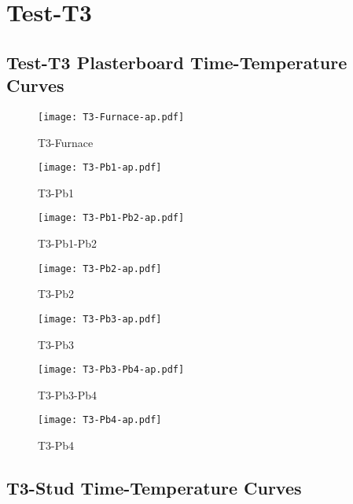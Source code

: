 \pagebreak

\section*{Test-T3}
\subsection*{Test-T3 Plasterboard Time-Temperature Curves}

\begin{figure}[htbp]
\centering
	\texttt{[image: T3-Furnace-ap.pdf]}
	\caption*{T3-Furnace}
\end{figure}
\begin{figure}[htbp]
	\centering
		\texttt{[image: T3-Pb1-ap.pdf]}
		\caption*{T3-Pb1}
\end{figure}
\begin{figure}[htbp]
	\centering
		\texttt{[image: T3-Pb1-Pb2-ap.pdf]}
		\caption*{T3-Pb1-Pb2}
\end{figure}
\begin{figure}[htbp]
	\centering
		\texttt{[image: T3-Pb2-ap.pdf]}
		\caption*{T3-Pb2}
\end{figure}
\begin{figure}[htbp]
	\centering
		\texttt{[image: T3-Pb3-ap.pdf]}
		\caption*{T3-Pb3}
\end{figure}
\begin{figure}[htbp]
	\centering
			\texttt{[image: T3-Pb3-Pb4-ap.pdf]}
			\caption*{T3-Pb3-Pb4}
\end{figure}
\begin{figure}[htbp]
	\centering
			\texttt{[image: T3-Pb4-ap.pdf]}
			\caption*{T3-Pb4}
\end{figure}

\pagebreak

\subsection*{T3-Stud Time-Temperature Curves}

